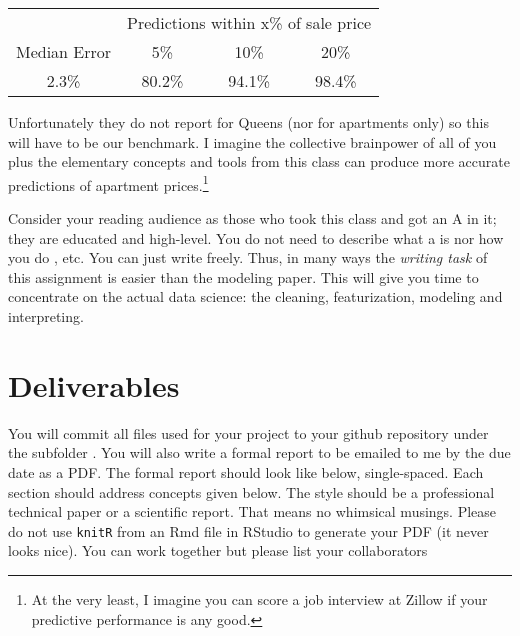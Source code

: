 \documentclass[12pt]{article}
\begin{document}
\begin{table}[htp]
\centering\small
\begin{tabular}{cccc}
& \multicolumn{3}{c}{Predictions within x\% of sale price} \\
Median Error 	 & 5\%  	&  10\%	&  20\%  \\
\hline
2.3\% &	80.2\%	& 94.1\%	& 98.4\%
\end{tabular}
\end{table}

\noindent Unfortunately they do not report for Queens (nor for apartments only) so this will have to be our benchmark.  I imagine the collective brainpower of all of you plus the elementary concepts and tools from this class can produce more accurate predictions of apartment prices.\footnote{At the very least, I imagine you can score a job interview at Zillow if your predictive performance is any good.} 

\pagebreak

%

Consider your reading audience as those who took this class and got an A in it; they are educated and high-level. You do not need to describe what a  is nor how you do , etc. You can just write freely. Thus, in many ways the \emph{writing task} of this assignment is easier than the modeling paper. This will give you time to concentrate on the actual data science: the cleaning, featurization, modeling and interpreting. 

\section*{Deliverables}

You will commit all files used for your project to your github repository under the subfolder . You will also write a formal report to be emailed to me by the due date as a PDF. The formal report should look like below, single-spaced. Each section should address concepts given below. The style should be a professional technical paper or a scientific report. That means no whimsical musings. Please do not use \texttt{knitR} from an Rmd file in RStudio to generate your PDF (it never looks nice). You can work together but please list your collaborators \\
\end{document}

